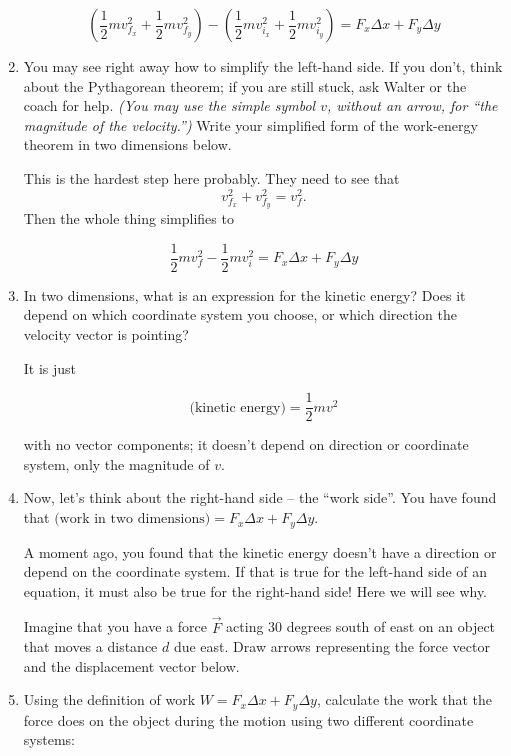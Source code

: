 \documentclass[12pt]{article}
\begin{document}
\begin{enumerate}
{$$
\left(\frac{1}{2}mv_{f_x}^2 + \frac{1}{2}mv_{f_y}^2 \right)- \left(\frac{1}{2}mv_{i_x}^2  + 	\frac{1}{2}mv_{i_y}^2\right) = F_x \Delta x + F_y \Delta y$$
}


\item You may see right away how to simplify the left-hand side. If you don't, think about the Pythagorean theorem; if you are still stuck, ask Walter or the coach for help. {\it (You may use the simple symbol $v$, without an arrow, for ``the magnitude of the velocity.'')} Write your simplified form of the work-energy theorem in two dimensions below. 

{\color{Red} This is the hardest step here probably. They need to see that $$v_{f_x}^2 + v_{f_y}^2 = v_f^2.$$ Then the whole thing simplifies to
	
	$$
	\frac{1}{2}mv_f^2 - \frac{1}{2}mv_i^2 = F_x \Delta x + F_y \Delta y$$}


\item In two dimensions, what is an expression for the kinetic energy? Does it depend on which coordinate system you choose, or which direction the velocity vector is pointing?

{\color{Red} It is just 
	
	$$\text{(kinetic energy)} = \frac{1}{2}mv^2$$
	
	with no vector components; it doesn't depend on direction or coordinate system, only the magnitude of $v$.}



\vspace{2in}
\newpage

\item Now, let's think about the right-hand side -- the ``work side''. You have found that 
$\text{(work in two dimensions)} = F_x \Delta x + F_y \Delta y.$

A moment ago, you found that the kinetic energy doesn't have a direction or depend on the coordinate system. If that is true for the left-hand side of an equation, it must also be true for the right-hand side! Here we will see why.

Imagine that you have a force $\vec F$ acting 30 degrees south of east on an object that moves a distance $d$ due east. Draw arrows representing the force vector and the displacement vector below.
\vspace{2in}


\item Using the definition of work $W = F_x \Delta x + F_y \Delta y$, calculate the work that the force does on the object during the motion using two different coordinate systems:


\end{enumerate}
\end{document}
